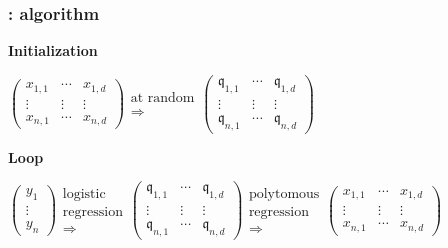 \documentclass[english,xcolor={rgb,dvipsnames,table,usenames}, presentation]{beamer}
\newcommand{\bqk}{\bm{\mathfrak{q}}}
\begin{document}
\begin{frame}
\frametitle{\secname: algorithm}

\tiny


\textbf{Initialization}


\medskip

$\left( \begin{array}{ccc}
x_{1,1} & \cdots & x_{1,d}  \\
 \vdots & \vdots & \vdots \\
 x_{n,1} & \cdots & x_{n,d} \end{array} \right)
\begin{array}{c}
\text{at random} \\
\Rightarrow \end{array}
\left( \begin{array}{ccc}
\bqk_{1,1} & \cdots & \bqk_{1,d}  \\
 \vdots & \vdots & \vdots \\
 \bqk_{n,1} & \cdots & \bqk_{n,d} \end{array} \right)$

\medskip

\textbf{Loop}

\medskip

$\left( \begin{array}{c}
y_1 \\
\vdots \\
y_n \end{array} \right)
\begin{array}{c}
\text{logistic} \\
\text{regression} \\
\Rightarrow \end{array}
\left( \begin{array}{ccc}
\bqk_{1,1} & \cdots & \bqk_{1,d}  \\
 \vdots & \vdots & \vdots \\
 \bqk_{n,1} & \cdots & \bqk_{n,d} \end{array} \right)
\begin{array}{c}
\text{polytomous} \\
\text{regression} \\
\Rightarrow \end{array}
\left( \begin{array}{ccc}
x_{1,1} & \cdots & x_{1,d}  \\
 \vdots & \vdots & \vdots \\
 x_{n,1} & \cdots & x_{n,d} \end{array} \right)
$


\end{frame}
\end{document}
